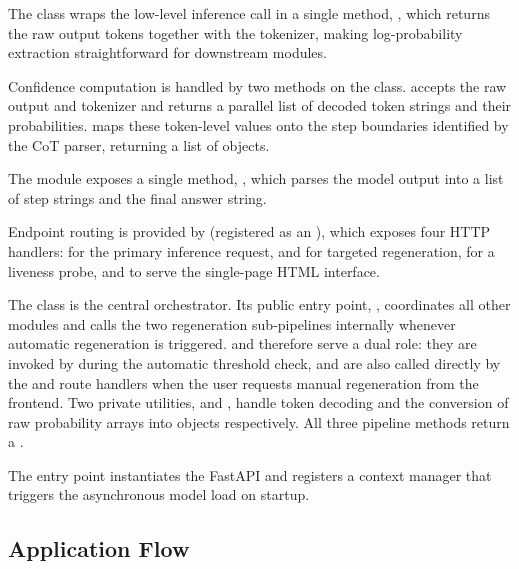 The  class wraps the low-level inference call in a single method,
, which returns the raw output tokens together with the
tokenizer, making log-proba\-bi\-li\-ty extraction straightforward for downstream modules.
 
Confidence computation is handled by two methods on the  class.
 accepts the raw output and tokenizer and returns a
parallel list of decoded token strings and their probabilities. 
maps these token-level values onto the step boundaries identified by the CoT parser,
returning a list of  objects.
 
The  module exposes a single method, , which parses
the model output into a list of step strings and the final answer string.
 
Endpoint routing is provided by  (registered as an
), which exposes four HTTP handlers:  for the primary
inference request,  and  for targeted
regeneration,  for a liveness probe, and  to
serve the single-page HTML interface.
 
The  class is the central orchestrator. Its public entry point,
, coordinates all other modules and calls the two
regeneration sub-pipelines internally whenever automatic regeneration is triggered.
 and  therefore
serve a dual role: they are invoked by  during the
automatic threshold check, and are also called directly by the  and
 route handlers when the user requests manual regeneration from the
frontend. Two private utilities,  and
, handle token decoding and the conversion of raw
probability arrays into  objects respectively. All three pipeline
methods return a .
 
The entry point  instantiates the FastAPI  and registers a
 context manager that triggers the asynchronous model load on startup.
 
\subsection{Application Flow}
 
